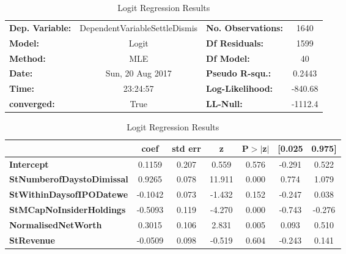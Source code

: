 \begin{table}[H]
\caption{Logit Regression Results}
\label{Logit}
\footnotesize
\begin{center}
\begin{tabular}{lclc}
\toprule
\textbf{Dep. Variable:}                & DependentVariableSettleDismis & \textbf{  No. Observations:  } &     1640    \\
\textbf{Model:}                        &             Logit             & \textbf{  Df Residuals:      } &     1599    \\
\textbf{Method:}                       &              MLE              & \textbf{  Df Model:          } &       40    \\
\textbf{Date:}                         &        Sun, 20 Aug 2017       & \textbf{  Pseudo R-squ.:     } &   0.2443    \\
\textbf{Time:}                         &            23:24:57           & \textbf{  Log-Likelihood:    } &   -840.68   \\
\textbf{converged:}                    &              True             & \textbf{  LL-Null:           } &   -1112.4   \\
\bottomrule
\end{tabular}
\begin{tabular}{lcccccc}
                                       & \textbf{coef} & \textbf{std err} & \textbf{z} & \textbf{P$>$$|$z$|$} & \textbf{[0.025} & \textbf{0.975]}  \\
\midrule
\textbf{Intercept}                     &       0.1159  &        0.207     &     0.559  &         0.576        &       -0.291    &        0.522     \\
\textbf{StNumberofDaystoDimissal}      &       0.9265  &        0.078     &    11.911  &         0.000        &        0.774    &        1.079     \\
\textbf{StWithinDaysofIPODatewe}       &      -0.1042  &        0.073     &    -1.432  &         0.152        &       -0.247    &        0.038     \\
\textbf{StMCapNoInsiderHoldings}       &      -0.5093  &        0.119     &    -4.270  &         0.000        &       -0.743    &       -0.276     \\
\textbf{NormalisedNetWorth}            &       0.3015  &        0.106     &     2.831  &         0.005        &        0.093    &        0.510     \\
\textbf{StRevenue}                     &      -0.0509  &        0.098     &    -0.519  &         0.604        &       -0.243    &        0.141     \\

\end{tabular}
\end{center}
\end{table}
